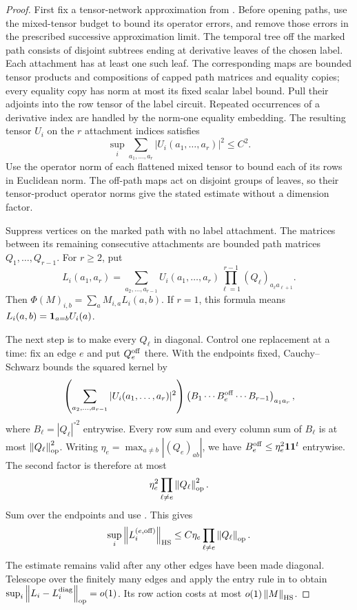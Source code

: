 \begin{proof}
First fix a tensor-network approximation from
. Before opening paths, use
the mixed-tensor budget to bound its operator errors, and remove
those errors in the prescribed successive approximation limit.
The temporal tree off the marked path consists of disjoint subtrees
ending at derivative leaves of the chosen label. Each attachment has
at least one such leaf. The corresponding maps are bounded tensor
products and compositions of capped path matrices and equality
copies; every equality copy has norm at most its fixed scalar label
bound. Pull their adjoints into the row tensor of the label circuit.
Repeated occurrences of a derivative index are handled by the
norm-one equality embedding. The resulting tensor $U_i$ on the $r$
attachment indices satisfies
\begin{equation}\label{eq:hidden-marked-row-tensor}
 \sup_i\sum_{a_1,\ldots,a_r}|U_i(a_1,\ldots,a_r)|^2\leq C^2.
\end{equation}
Use the operator norm of each flattened mixed tensor to bound each
of its rows in Euclidean norm. The off-path maps act on disjoint
groups of leaves, so their tensor-product operator norms give the
stated estimate without a dimension factor.

Suppress vertices on the marked path with no label attachment. The
matrices between its remaining consecutive attachments are bounded
path matrices $Q_1,\ldots,Q_{r-1}$. For $r\geq2$, put
\begin{equation}\label{eq:hidden-marked-kernel}
 L_i(a_1,a_r)=\sum_{a_2,\ldots,a_{r-1}}
 U_i(a_1,\ldots,a_r)\prod_{\ell=1}^{r-1}
                       (Q_\ell)_{a_\ell a_{\ell+1}}.
\end{equation}
Then $\Phi(M)_{i,b}=\sum_a M_{i,a}L_i(a,b)$. If $r=1$, this formula
means $L_i(a,b)=\mathbf 1_{a=b}U_i(a)$.

The next step is to make every $Q_\ell$ in
 diagonal. Control one replacement at
a time: fix an edge $e$ and put $Q_e^{\rm off}$ there. With the
endpoints fixed, Cauchy--Schwarz bounds the squared kernel by
\[
 \left(\sum_{a_2,\ldots,a_{r-1}}|U_i(a_1,\ldots,a_r)|^2\right)
 \left(B_1\cdots B_e^{\rm off}\cdots B_{r-1}\right)_{a_1a_r},
\]
where $B_\ell=|Q_\ell|^{\circ2}$ entrywise. Every row sum and every
column sum of $B_\ell$ is at most $\left\lVert Q_\ell\right\rVert_{\mathrm{op}}^2$.
Writing $\eta_e=\max_{a\ne b}|(Q_e)_{ab}|$, we have
$B_e^{\rm off}\leq\eta_e^2\mathbf 1\mathbf 1^t$ entrywise. The second factor is
therefore at most
\[
 \eta_e^2\prod_{\ell\ne e}\left\lVert Q_\ell\right\rVert_{\mathrm{op}}^2.
\]
Sum over the endpoints and use .
This gives
\[
 \sup_i\left\lVert L_i^{(e,\rm off)}\right\rVert_{\mathrm{HS}}
 \leq C\eta_e\prod_{\ell\ne e}\left\lVert Q_\ell\right\rVert_{\mathrm{op}}.
\]
The estimate remains valid after any other edges have been made
diagonal. Telescope over the finitely many edges and apply the entry
rule in  to obtain
$\sup_i\left\lVert L_i-L_i^{\rm diag}\right\rVert_{\mathrm{op}}=o(1)$. Its row action costs
at most $o(1)\left\lVert M\right\rVert_{\mathrm{HS}}$.


\end{proof}
